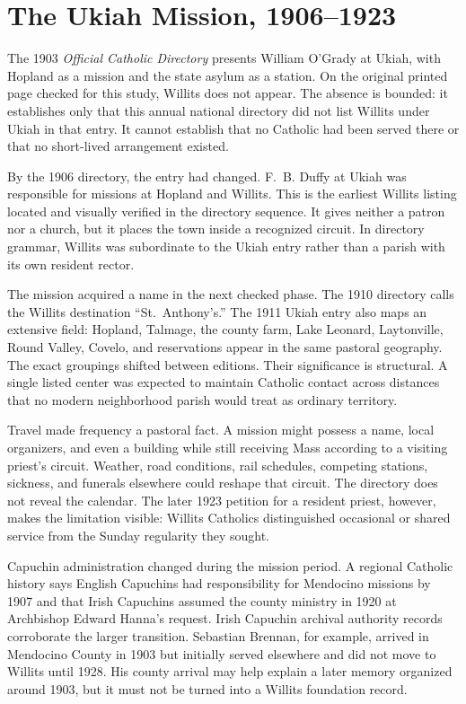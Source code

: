 \section{The Ukiah Mission, 1906--1923}

The 1903 \emph{Official Catholic Directory} presents William O'Grady at Ukiah, with Hopland as a mission and the state asylum as a station. On the original printed page checked for this study, Willits does not appear. The absence is bounded: it establishes only that this annual national directory did not list Willits under Ukiah in that entry. It cannot establish that no Catholic had been served there or that no short-lived arrangement existed.

By the 1906 directory, the entry had changed. F.~B. Duffy at Ukiah was responsible for missions at Hopland and Willits. This is the earliest Willits listing located and visually verified in the directory sequence. It gives neither a patron nor a church, but it places the town inside a recognized circuit. In directory grammar, Willits was subordinate to the Ukiah entry rather than a parish with its own resident rector.

The mission acquired a name in the next checked phase. The 1910 directory calls the Willits destination ``St.~Anthony's.'' The 1911 Ukiah entry also maps an extensive field: Hopland, Talmage, the county farm, Lake Leonard, Laytonville, Round Valley, Covelo, and reservations appear in the same pastoral geography. The exact groupings shifted between editions. Their significance is structural. A single listed center was expected to maintain Catholic contact across distances that no modern neighborhood parish would treat as ordinary territory.

Travel made frequency a pastoral fact. A mission might possess a name, local organizers, and even a building while still receiving Mass according to a visiting priest's circuit. Weather, road conditions, rail schedules, competing stations, sickness, and funerals elsewhere could reshape that circuit. The directory does not reveal the calendar. The later 1923 petition for a resident priest, however, makes the limitation visible: Willits Catholics distinguished occasional or shared service from the Sunday regularity they sought.

Capuchin administration changed during the mission period. A regional Catholic history says English Capuchins had responsibility for Mendocino missions by 1907 and that Irish Capuchins assumed the county ministry in 1920 at Archbishop Edward Hanna's request. Irish Capuchin archival authority records corroborate the larger transition. Sebastian Brennan, for example, arrived in Mendocino County in 1903 but initially served elsewhere and did not move to Willits until 1928. His county arrival may help explain a later memory organized around 1903, but it must not be turned into a Willits foundation record.

